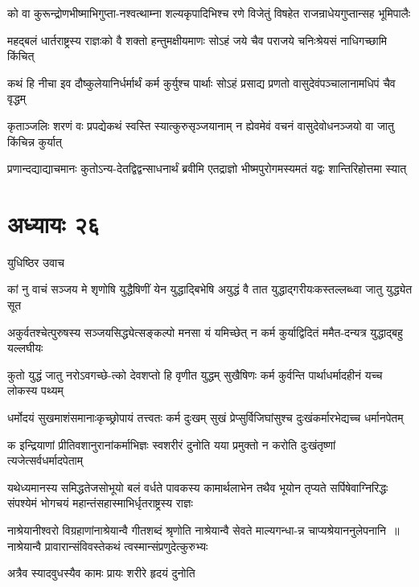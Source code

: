 \twolineshloka
{को वा कुरून्द्रोणभीष्माभिगुप्ता-नश्वत्थाम्ना शल्यकृपादिभिश्च}
{रणे विजेतुं विषहेत राजन्राधेयगुप्तान्सह भूमिपालैः}


\twolineshloka
{महद्बलं धार्तराष्ट्रस्य राज्ञःको वै शक्तो हन्तुमक्षीयमाणः}
{सोऽहं जये चैव पराजये चनिःश्रेयसं नाधिगच्छामि किंचित्}


\twolineshloka
{कथं हि नीचा इव दौष्कुलेयानिर्धर्मार्थं कर्म कुर्युश्च पार्थाः}
{सोऽहं प्रसाद्य प्रणतो वासुदेवंपञ्चालानामधिपं चैव वृद्धम्}


\twolineshloka
{कृताञ्जलिः शरणं वः प्रपद्येकथं स्वस्ति स्यात्कुरुसृञ्जयानाम्}
{न ह्येवमेवं वचनं वासुदेवोधनञ्जयो वा जातु किंचिन्न कुर्यात्}


\twolineshloka
{प्रणान्दद्याद्याचमानः कुतोऽन्य-देतद्विद्वन्साधनार्थं ब्रवीमि}
{एतद्राज्ञो भीष्मपुरोगमस्यमतं यद्वः शान्तिरिहोत्तमा स्यात्}


\chapter{अध्यायः २६}
\twolineshloka
{युधिष्ठिर उवाच}
{}


\threelineshloka
{कां नु वाचं सञ्जय मे शृणोषि}
{युद्धैषिणीं येन युद्धाद्बिभेषि}
{अयुद्धं वै तात युद्धाद्गरीयःकस्तल्लब्ध्वा जातु युद्ध्येत सूत}


\twolineshloka
{अकुर्वतश्चेत्पुरुषस्य सञ्जयसिद्ध्येत्सङ्कल्पो मनसा यं यमिच्छेत्}
{न कर्म कुर्याद्विदितं ममैत-दन्यत्र युद्धाद्बहु यल्लघीयः}


\twolineshloka
{कुतो युद्धं जातु नरोऽवगच्छे-त्को देवशप्तो हि वृणीत युद्धम्}
{सुखैषिणः कर्म कुर्वन्ति पार्थाधर्मादहीनं यच्च लोकस्य पथ्यम्}


\twolineshloka
{धर्मोदयं सुखमाशंसमानाःकृच्छ्रोपायं तत्त्वतः कर्म दुःखम्}
{सुखं प्रेप्सुर्विजिघांसुश्च दुःखंकर्मारभेद्यच्च धर्मानपेतम्}


\twolineshloka
{क इन्द्रियाणां प्रीतिवशानुरानांकर्माभिज्ञः स्वशरीरं दुनोति}
{यया प्रमुक्तो न करोति दुःखंतृष्णां त्यजेत्सर्वधर्मादपेताम्}


\threelineshloka
{यथेध्यमानस्य समिद्धतेजसोभूयो बलं वर्धते पावकस्य}
{कामार्थलाभेन तथैव भूयोन तृप्यते सर्पिषेवाग्निरिद्धः}
{संपश्येमं भोगचयं महान्तंसहास्माभिर्धृतराष्ट्रस्य राज्ञः}


\twolineshloka
{नाश्रेयानीश्वरो विग्रहाणांनाश्रेयान्वै गीतशब्दं श्रृणोति}
{नाश्रेयान्वै सेवते माल्यगन्धा-न्न चाप्यश्रेयाननुलेपनानि ॥नाश्रेयान्वै प्रावारान्संविवस्तेकथं त्वस्मान्संप्रणुदेत्कुरुभ्यः}


\twolineshloka
{अत्रैव स्यादवुधस्यैव कामः}
{प्रायः शरीरे हृदयं दुनोति}



